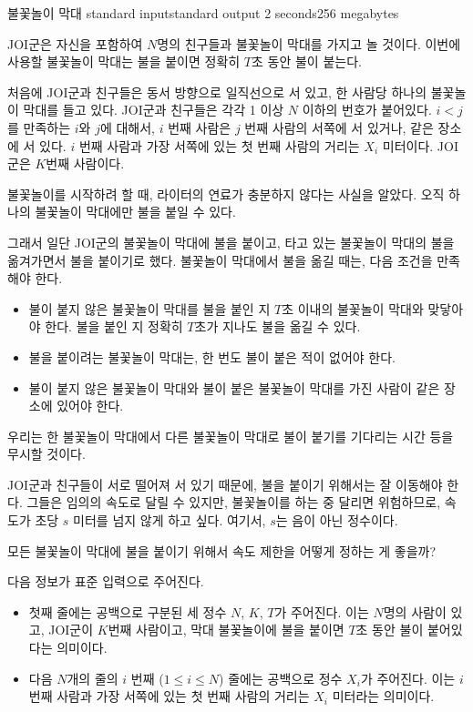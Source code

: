 \begin{problem}{불꽃놀이 막대}
	{standard input}{standard output}
	{2 seconds}{256 megabytes}{}
	
	JOI군은 자신을 포함하여 $N$명의 친구들과 불꽃놀이 막대를 가지고 놀 것이다. 이번에 사용할 불꽃놀이 막대는 불을 붙이면 정확히 $T$초 동안 불이 붙는다.
	
	처음에 JOI군과 친구들은 동서 방향으로 일직선으로 서 있고, 한 사람당 하나의 불꽃놀이 막대를 들고 있다. JOI군과 친구들은 각각 1 이상 $N$ 이하의 번호가 붙어있다. $i<j$를 만족하는 $i$와 $j$에 대해서, $i$ 번째 사람은 $j$ 번째 사람의 서쪽에 서 있거나, 같은 장소에 서 있다. $i$ 번째 사람과 가장 서쪽에 있는 첫 번째 사람의 거리는 $X_i$ 미터이다. JOI군은 $K$번째 사람이다.
	
	불꽃놀이를 시작하려 할 때, 라이터의 연료가 충분하지 않다는 사실을 알았다. 오직 하나의 불꽃놀이 막대에만 불을 붙일 수 있다.
	
	그래서 일단 JOI군의 불꽃놀이 막대에 불을 붙이고, 타고 있는 불꽃놀이 막대의 불을 옮겨가면서 불을 붙이기로 했다. 불꽃놀이 막대에서 불을 옮길 때는, 다음 조건을 만족해야 한다.
	
	\begin{itemize}
		\item 불이 붙지 않은 불꽃놀이 막대를 불을 붙인 지 $T$초 이내의 불꽃놀이 막대와 맞닿아야 한다. 불을 붙인 지 정확히 $T$초가 지나도 불을 옮길 수 있다.
		\item 불을 붙이려는 불꽃놀이 막대는, 한 번도 불이 붙은 적이 없어야 한다.
		\item 불이 붙지 않은 불꽃놀이 막대와 불이 붙은 불꽃놀이 막대를 가진 사람이 같은 장소에 있어야 한다.
	\end{itemize}
	
	우리는 한 불꽃놀이 막대에서 다른 불꽃놀이 막대로 불이 붙기를 기다리는 시간 등을 무시할 것이다.
	
	JOI군과 친구들이 서로 떨어져 서 있기 때문에, 불을 붙이기 위해서는 잘 이동해야 한다. 그들은 임의의 속도로 달릴 수 있지만, 불꽃놀이를 하는 중 달리면 위험하므로, 속도가 초당 $s$ 미터를 넘지 않게 하고 싶다. 여기서, $s$는 음이 아닌 정수이다.
	
	모든 불꽃놀이 막대에 불을 붙이기 위해서 속도 제한을 어떻게 정하는 게 좋을까?
	
	\InputFile
	
	다음 정보가 표준 입력으로 주어진다.
	
	\begin{itemize}
		\item 첫째 줄에는 공백으로 구분된 세 정수 $N$, $K$, $T$가 주어진다. 이는 $N$명의 사람이 있고, JOI군이 $K$번째 사람이고, 막대 불꽃놀이에 불을 붙이면 $T$초 동안 불이 붙어있다는 의미이다.
		\item 다음 $N$개의 줄의 $i$ 번째 ($1 \le i \le N$) 줄에는 공백으로 정수 $X_i$가 주어진다. 이는 $i$ 번째 사람과 가장 서쪽에 있는 첫 번째 사람의 거리는 $X_i$ 미터라는 의미이다.
	\end{itemize}
	

\end{problem}

